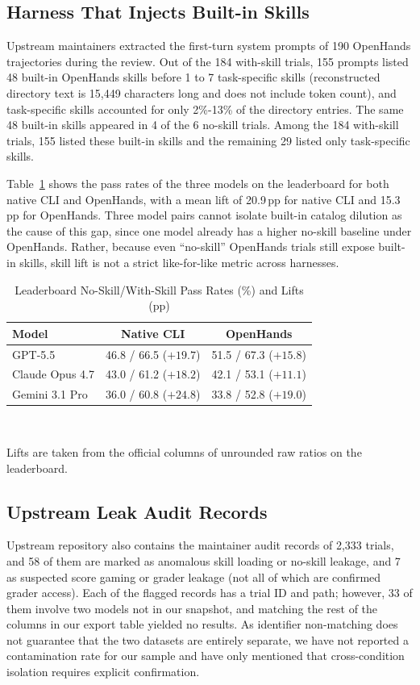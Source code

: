 \documentclass[10pt,conference]{IEEEtran}
\newif\ifkeepcuts \keepcutsfalse
\newcommand{\cut}[1]{\ifkeepcuts #1\fi}
\begin{document}
\subsection{Harness That Injects Built-in Skills}
Upstream maintainers extracted the first-turn system prompts of 190 OpenHands trajectories during the review\cut{ and found that there is a considerable built-in overhead in the skill directories of these prompts}. Out of the 184 with-skill trials, 155 prompts listed 48 built-in OpenHands skills before 1 to 7 task-specific skills (reconstructed directory text is 15,449 characters long and does not include token count), and task-specific skills accounted for only 2\%-13\% of the directory entries. The same 48 built-in skills appeared in 4 of the 6 no-skill trials. Among the 184 with-skill trials, 155 listed these built-in skills and the remaining 29 listed only task-specific skills.

Table~\ref{tab:harness} shows the pass rates of the three models on the leaderboard for both native CLI and OpenHands, with a mean lift of 20.9\,pp for native CLI and 15.3\,pp for OpenHands. Three model pairs cannot isolate built-in catalog dilution as the cause of this gap, since one model already has a higher no-skill baseline under OpenHands. Rather, because even ``no-skill'' OpenHands trials still expose built-in skills, skill lift is not a strict like-for-like metric across harnesses.

\begin{table}[t]
\caption{Leaderboard No-Skill/With-Skill Pass Rates (\%) and Lifts (pp)}
\label{tab:harness}
\centering
\begin{tabular}{@{}lcc@{}}
\toprule
Model & Native CLI & OpenHands \\
\midrule
GPT-5.5 & 46.8 / 66.5 ($+19.7$) & 51.5 / 67.3 ($+15.8$) \\
Claude Opus 4.7 & 43.0 / 61.2 ($+18.2$) & 42.1 / 53.1 ($+11.1$) \\
Gemini 3.1 Pro & 36.0 / 60.8 ($+24.8$) & 33.8 / 52.8 ($+19.0$) \\
\bottomrule
\end{tabular}\\[2pt]
\parbox{\columnwidth}{\footnotesize Lifts are taken from the official columns of unrounded raw ratios on the leaderboard.}
\end{table}

\subsection{Upstream Leak Audit Records}
Upstream repository also contains the maintainer audit records of 2,333 trials, and 58 of them are marked as anomalous skill loading or no-skill leakage, and 7 as suspected score gaming or grader leakage (not all of which are confirmed grader access). Each of the flagged records has a trial ID and path; however, 33 of them involve two models not in our snapshot, and matching the rest of the columns in our export table yielded no results. As identifier non-matching does not guarantee that the two datasets are entirely separate, we have not reported a contamination rate for our sample and have only mentioned that cross-condition isolation requires explicit confirmation.
\end{document}
